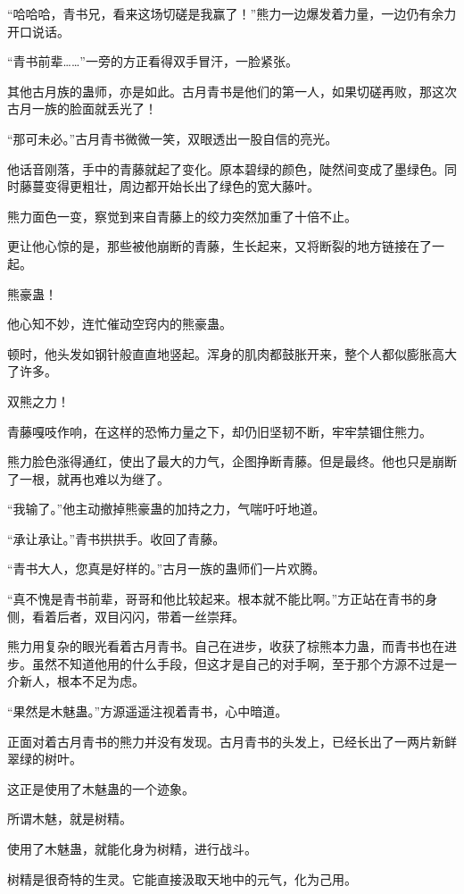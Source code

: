 \begin{this_body}
“哈哈哈，青书兄，看来这场切磋是我赢了！”熊力一边爆发着力量，一边仍有余力开口说话。

“青书前辈……”一旁的方正看得双手冒汗，一脸紧张。

其他古月族的蛊师，亦是如此。古月青书是他们的第一人，如果切磋再败，那这次古月一族的脸面就丢光了！

“那可未必。”古月青书微微一笑，双眼透出一股自信的亮光。

他话音刚落，手中的青藤就起了变化。原本碧绿的颜色，陡然间变成了墨绿色。同时藤蔓变得更粗壮，周边都开始长出了绿色的宽大藤叶。

熊力面色一变，察觉到来自青藤上的绞力突然加重了十倍不止。

更让他心惊的是，那些被他崩断的青藤，生长起来，又将断裂的地方链接在了一起。

熊豪蛊！

他心知不妙，连忙催动空窍内的熊豪蛊。

顿时，他头发如钢针般直直地竖起。浑身的肌肉都鼓胀开来，整个人都似膨胀高大了许多。

双熊之力！

青藤嘎吱作响，在这样的恐怖力量之下，却仍旧坚韧不断，牢牢禁锢住熊力。

熊力脸色涨得通红，使出了最大的力气，企图挣断青藤。但是最终。他也只是崩断了一根，就再也难以为继了。

“我输了。”他主动撤掉熊豪蛊的加持之力，气喘吁吁地道。

“承让承让。”青书拱拱手。收回了青藤。

“青书大人，您真是好样的。”古月一族的蛊师们一片欢腾。

“真不愧是青书前辈，哥哥和他比较起来。根本就不能比啊。”方正站在青书的身侧，看着后者，双目闪闪，带着一丝崇拜。

熊力用复杂的眼光看着古月青书。自己在进步，收获了棕熊本力蛊，而青书也在进步。虽然不知道他用的什么手段，但这才是自己的对手啊，至于那个方源不过是一介新人，根本不足为虑。

“果然是木魅蛊。”方源遥遥注视着青书，心中暗道。

正面对着古月青书的熊力并没有发现。古月青书的头发上，已经长出了一两片新鲜翠绿的树叶。

这正是使用了木魅蛊的一个迹象。

所谓木魅，就是树精。

使用了木魅蛊，就能化身为树精，进行战斗。

树精是很奇特的生灵。它能直接汲取天地中的元气，化为己用。


\end{this_body}
